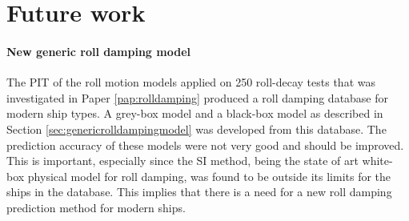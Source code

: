 \chapter{Future work\label{ch:future_work}}

\subsubsection*{New generic roll damping model}
The PIT of the roll motion models applied on 250 roll-decay tests that was investigated in Paper \ref{pap:rolldamping} produced a roll damping database for modern ship types. A grey-box model and a black-box model as described in Section \ref{sec:genericrolldampingmodel} was developed from this database. The prediction accuracy of these models were not very good and should be improved. This is important, especially since the SI method, being the state of art white-box physical model for roll damping, was found to be outside its limits for the ships in the database. This implies that there is a need for a new roll damping prediction method for modern ships.